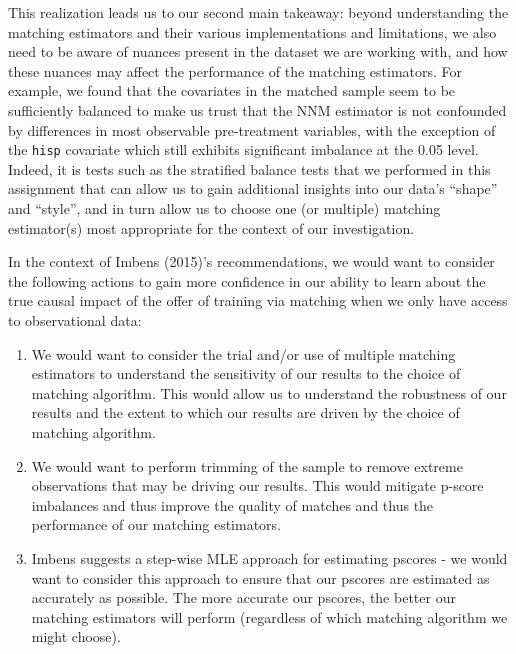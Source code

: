 \documentclass[
]{article}
\begin{document}
This realization leads us to our second main takeaway: beyond
understanding the matching estimators and their various implementations
and limitations, we also need to be aware of nuances present in the
dataset we are working with, and how these nuances may affect the
performance of the matching estimators. For example, we found that the
covariates in the matched sample seem to be sufficiently balanced to
make us trust that the NNM estimator is not confounded by differences in
most observable pre-treatment variables, with the exception of the
\texttt{hisp} covariate which still exhibits significant imbalance at
the 0.05 level. Indeed, it is tests such as the stratified balance tests
that we performed in this assignment that can allow us to gain
additional insights into our data's ``shape'' and ``style'', and in turn
allow us to choose one (or multiple) matching estimator(s) most
appropriate for the context of our investigation.

In the context of Imbens (2015)'s recommendations, we would want to
consider the following actions to gain more confidence in our ability to
learn about the true causal impact of the offer of training via matching
when we only have access to observational data:

\begin{enumerate}
\def\labelenumi{\arabic{enumi}.}
\item
  We would want to consider the trial and/or use of multiple matching
  estimators to understand the sensitivity of our results to the choice
  of matching algorithm. This would allow us to understand the
  robustness of our results and the extent to which our results are
  driven by the choice of matching algorithm.
\item
  We would want to perform trimming of the sample to remove extreme
  observations that may be driving our results. This would mitigate
  p-score imbalances and thus improve the quality of matches and thus
  the performance of our matching estimators.
\item
  Imbens suggests a step-wise MLE approach for estimating pscores - we
  would want to consider this approach to ensure that our pscores are
  estimated as accurately as possible. The more accurate our pscores,
  the better our matching estimators will perform (regardless of which
  matching algorithm we might choose).
\end{enumerate}
\end{document}
